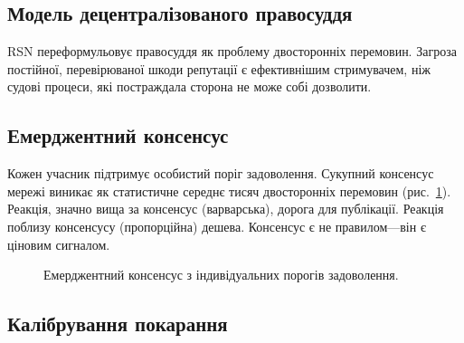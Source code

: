 \documentclass[11pt,a4paper,twocolumn]{article}
\begin{document}
\subsection{Модель децентралізованого правосуддя}

RSN переформульовує правосуддя як проблему двосторонніх перемовин. Загроза постійної, перевірюваної шкоди репутації є ефективнішим стримувачем, ніж судові процеси, які постраждала сторона не може собі дозволити.

\subsection{Емерджентний консенсус}

Кожен учасник підтримує особистий поріг задоволення. Сукупний консенсус мережі виникає як статистичне середнє тисяч двосторонніх перемовин (рис.~\ref{fig:consensus}). Реакція, значно вища за консенсус (варварська), дорога для публікації. Реакція поблизу консенсусу (пропорційна) дешева. Консенсус є не правилом---він є ціновим сигналом.

\begin{figure}[ht]
\centering
{}
\caption{Емерджентний консенсус з індивідуальних порогів задоволення.}
\label{fig:consensus}
\end{figure}

\subsection{Калібрування покарання}
\end{document}
